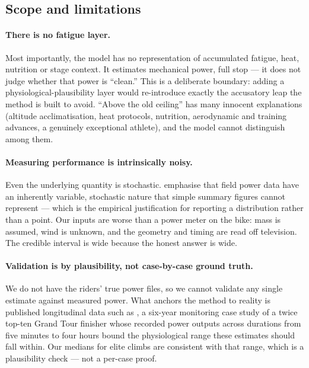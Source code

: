 \documentclass[11pt]{article}
\begin{document}
\subsection{Scope and limitations}

\paragraph{There is no fatigue layer.}
Most importantly, the model has no representation of accumulated fatigue, heat,
nutrition or stage context. It estimates mechanical power, full stop --- it does
not judge whether that power is ``clean.'' This is a deliberate boundary: adding
a physiological-plausibility layer would re-introduce exactly the accusatory leap
the method is built to avoid. ``Above the old ceiling'' has many innocent
explanations (altitude acclimatisation, heat protocols, nutrition, aerodynamic
and training advances, a genuinely exceptional athlete), and the model cannot
distinguish among them.

\paragraph{Measuring performance is intrinsically noisy.}
Even the underlying quantity is stochastic. \citet{passfield2017} emphasise that
field power data have an inherently variable, stochastic nature that simple
summary figures cannot represent --- which is the empirical justification for
reporting a distribution rather than a point. Our inputs are worse than a power
meter on the bike: mass is assumed, wind is unknown, and the geometry and timing
are read off television. The credible interval is wide because the honest answer
is wide.

\paragraph{Validation is by plausibility, not case-by-case ground truth.}
We do not have the riders' true power files, so we cannot validate any single
estimate against measured power. What anchors the method to reality is published
longitudinal data such as \citet{pinot2015}, a six-year monitoring case study of
a twice top-ten Grand Tour finisher whose recorded power outputs across durations
from five minutes to four hours bound the physiological range these estimates
should fall within. Our medians for elite climbs are consistent with that range,
which is a plausibility check --- not a per-case proof.
\end{document}
